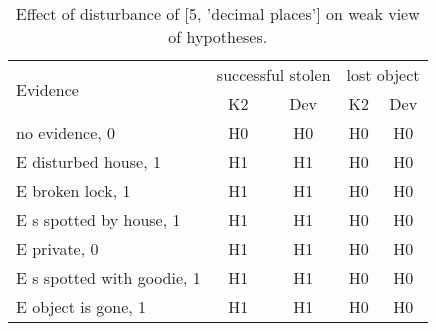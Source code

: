 \begin{table}\begin{tabular}{l|cc|cc}\toprule\multirow{2}{*}{Evidence} & \multicolumn{2}{c}{successful stolen}& \multicolumn{2}{c}{lost object}\\& {K2} & {Dev}& {K2} & {Dev}\\\midrule
no evidence, 0 & H0&H0&H0&H0\\E disturbed house, 1 & H1&H1&H0&H0\\E broken lock, 1 & H1&H1&H0&H0\\E s spotted by house, 1 & H1&H1&H0&H0\\E private, 0 & H1&H1&H0&H0\\E s spotted with goodie, 1 & H1&H1&H0&H0\\E object is gone, 1 & H1&H1&H0&H0\\\bottomrule\end{tabular}\caption{Effect of disturbance of [5, 'decimal places'] on weak view of hypotheses.}\end{table}